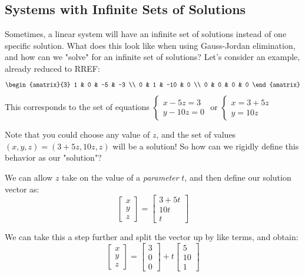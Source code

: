 \documentclass[11pt]{exam}
\begin{document}
    \vspace{20px}
    \subsection{Systems with Infinite Sets of Solutions}
        Sometimes, a linear system will have an infinite set of solutions instead of one specific solution. What does this look like when using
        Gauss-Jordan elimination, and how can we "solve" for an infinite set of solutions? Let's consider an example, already reduced to RREF:
        $$\begin{amatrix}{3}
            1 & 0 & -5 & -3 \\
            0 & 1 & -10 & 0 \\
            0 & 0 & 0 & 0
        \end{amatrix}$$
        This corresponds to the set of equations $\begin{cases}
            x - 5z = 3 \\
            y - 10z = 0
        \end{cases}$
        or $\begin{cases}
            x = 3 + 5z \\
            y = 10z
        \end{cases}$

        Note that you could choose any value of $z$, and the set of values $(x,y,z) = (3 + 5z, 10z, z)$ will be a solution! So how can we rigidly define
        this behavior as our "solution"?

        We can allow $z$ take on the value of a \textit{parameter} $t$, and then define our solution vector as:
        $$\begin{bmatrix} x \\ y \\ z \end{bmatrix} = \begin{bmatrix} 3 + 5t \\ 10t \\ t \end{bmatrix}$$
        
        We can take this a step further and split the vector up by like terms, and obtain:
        $$\begin{bmatrix} x \\ y \\ z \end{bmatrix} = \begin{bmatrix} 3 \\ 0 \\ 0 \end{bmatrix} + t\begin{bmatrix} 5 \\ 10 \\ 1 \end{bmatrix}$$
\end{document}
